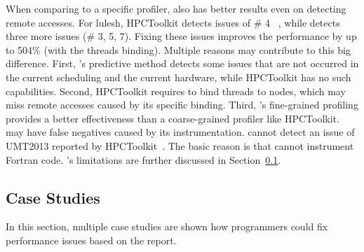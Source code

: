 When comparing to a specific profiler, \NP{} also has better results even on detecting remote accesses. For lulesh, HPCToolkit detects issues of \# 4 ~\cite{XuNuma}, while \NP{} detects three more issues (\# 3, 5, 7). Fixing these issues improves the performance by up to 504\% (with the threads binding). Multiple reasons may contribute to this big difference. 
 First, \NP{}'s predictive method detects some issues that are not occurred in the current scheduling and the current hardware, while HPCToolkit has no such capabilities. Second, HPCToolkit requires to bind threads to nodes, which may miss remote accesses caused by its specific binding. 
Third, \NP{}'s fine-grained profiling provides a better effectiveness than a coarse-grained profiler like HPCToolkit. 
\NP{} may have false negatives caused by its instrumentation. \NP{} cannot detect an issue of UMT2013 reported by HPCToolkit~\cite{XuNuma}. The basic reason is that \NP{} cannot instrument Fortran code. \NP{}'s limitations are further discussed in Section~\ref{sec:casestudies}.




\subsection{Case Studies}
\label{sec:casestudies}
In this section, multiple case studies are shown how programmers could fix performance issues based on the report. 


